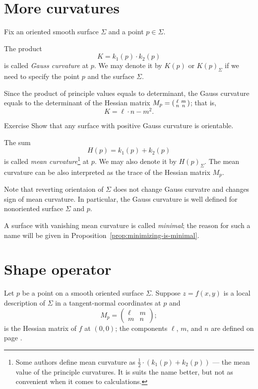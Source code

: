 \section{More curvatures}

Fix an oriented smooth surface $\Sigma$ and a point $p\in\Sigma$.

The product 
\[K=k_1(p)\cdot k_2(p)\]
is called \emph{Gauss curvature} at $p$.
We may denote it by $K(p)$ or $K(p)_\Sigma$ if we need to specify the point $p$ and the surface $\Sigma$.

Since the product of principle values equals to determinant,
the Gauss curvature equals to the determinant of the Hessian matrix 
$M_p\z=
(\begin{smallmatrix}
\ell&m\\n&n
\end{smallmatrix}
)
$;
that is,
\[K=\ell\cdot n-m^2.\]

\begin{thm}{Exercise}\label{ex:gauss+orientable}
Show that any surface with positive Gauss curvature is orientable. 
\end{thm}

The sum 
\[H(p)=k_1(p)+ k_2(p)\] 
is called \emph{mean curvature}\footnote{Some authors define mean curvature as $\tfrac12\cdot(k_1(p)+ k_2(p))$ --- the mean value of the principle curvatures. It is suits the name better, but not as convenient when it comes to calculations.} at $p$.
We may also denote it by $H(p)_\Sigma$.
The mean curvature can be also interpreted as the trace of the Hessian matrix $M_p$. 

Note that reverting orientaion of $\Sigma$ does not change Gauss curvatre and changes sign of mean curvature.
In particular, the Gauss curvature is well defined for nonoriented surface $\Sigma$ and $p$.

A surface with vanishing mean curvature is called \emph{minimal};
the reason for such a name will be given in Proposition~\ref{prop:minimizing-is-minimal}.

\section{Shape operator}

Let $p$ be a point on a smooth oriented surface $\Sigma$.
Suppose $z=f(x,y)$ is a local description of $\Sigma$ in a tangent-normal coordinates at $p$
and 
\[M_p=\begin{pmatrix}
   \ell
   &m
   \\
   m
   &n
  \end{pmatrix};
\]
is the Hessian matrix of $f$ at $(0,0)$; the components $\ell$, $m$, and $n$ are defined on page \pageref{page:lmn}.

